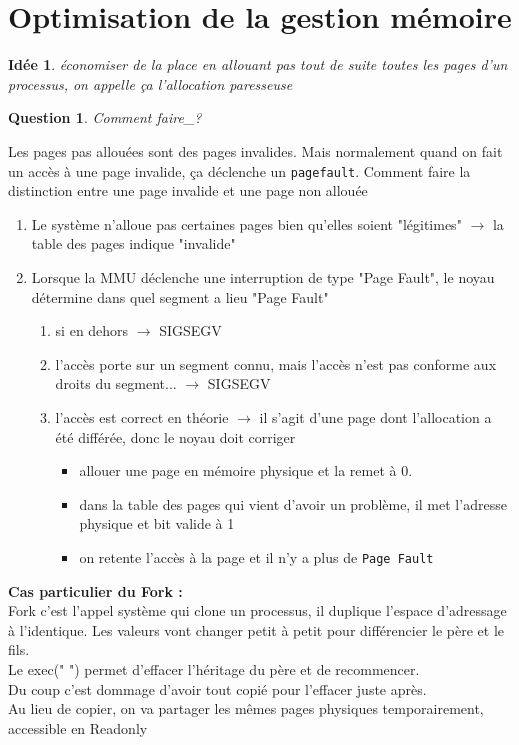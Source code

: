 \documentclass[12pt,a4paper]{report}
\newtheorem*{q}{Question}
\newtheorem*{id}{Idée}
\begin{document}
\bigskip

\section{Optimisation de la gestion mémoire}
\begin{id}économiser de la place en allouant pas tout de suite toutes les pages d'un processus, on appelle ça l'\emph{allocation paresseuse} \end{id}

\begin{q}Comment faire_? \end{q}
Les pages pas allouées sont des pages invalides. Mais normalement quand on fait un accès à une page invalide, ça déclenche un \verb?pagefault?. Comment faire la distinction entre une page invalide et une page non allouée\\

\begin{enumerate}
\item Le système n'alloue pas certaines pages bien qu'elles soient "légitimes" $\rightarrow$ la table des pages indique "invalide"
\item Lorsque la MMU déclenche une interruption de type "Page Fault", le noyau détermine dans quel segment a lieu "Page Fault"
\begin{enumerate}
\item si en dehors $\rightarrow$ SIGSEGV
\item l'accès porte sur un segment connu, mais l’accès n'est pas conforme aux droits du segment... $\rightarrow$ SIGSEGV
\item l'accès est correct en théorie $\rightarrow$ il s'agit d'une page dont l'allocation a été différée, donc le noyau doit corriger
\begin{itemize}
\item[action 1 :] allouer une page en mémoire physique et la remet à 0.
\item[action 2 :] dans la table des pages qui vient d'avoir un problème, il met l'adresse physique et bit valide à 1
\item[action 3 :] on retente l'accès à la page et il n'y a plus de \verb?Page Fault?
\end{itemize}
\end{enumerate}
\end{enumerate}

\medskip
\textbf{Cas particulier du Fork :}\\
Fork c'est l'appel système qui clone un processus, il duplique l'espace d'adressage à l'identique. Les valeurs vont changer petit à petit pour différencier le père et le fils.\\
Le exec("   ") permet d'effacer l'héritage du père et de recommencer. \\
Du coup c'est dommage d'avoir tout copié pour l'effacer juste après. \\
Au lieu de copier, on va partager les mêmes pages physiques temporairement, accessible en Readonly\\
\end{document}
